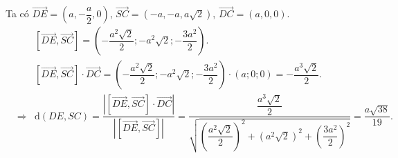 \begin{bt}
{\begin{center}
		\end{center}
		 Ta có
		 $
		 \overrightarrow{DE} = \left(a, -\dfrac{a}{2}, 0\right)$, $ \overrightarrow{SC} = \left(-a, -a, a\sqrt{2}\right)$, $ \overrightarrow{DC} = (a, 0, 0)$.
		\begin{eqnarray*}
			& & \left[\overrightarrow{DE},  \overrightarrow{SC}\right] =
			\left(-\dfrac{a^2\sqrt{2}}{2}; -a^2\sqrt{2}; -\dfrac{3a^2}{2}  \right).\\
			& & \left[\overrightarrow{DE}, \overrightarrow{SC}\right] \cdot \overrightarrow{DC} = \left(-\dfrac{a^2\sqrt{2}}{2}; -a^2\sqrt{2}; -\dfrac{3a^2}{2} \right)  \cdot (a; 0; 0) = -\dfrac{a^3\sqrt{2}}{2}.\\
			&\Rightarrow&\mathrm{d}(DE, SC) = \dfrac{\left|\left[\overrightarrow{DE},  \overrightarrow{SC}\right] \cdot \overrightarrow{DC}\right|}{\left|\left[\overrightarrow{DE}, \overrightarrow{SC}\right]\right|} = \dfrac{\dfrac{a^3\sqrt{2}}{2}}{\sqrt{\left(\dfrac{a^2\sqrt{2}}{2}\right)^2 + \left(a^2\sqrt{2}\right)^2 + \left(\dfrac{3a^2}{2}\right)^2}} = \dfrac{a\sqrt{38}}{19}.
		\end{eqnarray*}
	 }
\end{bt}

